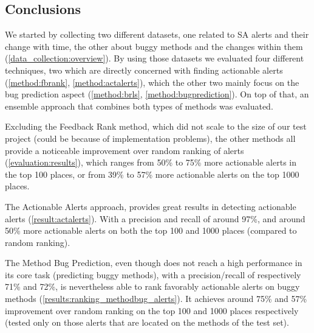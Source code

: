 \subsection{Conclusions}

We started by collecting two different datasets, one related to SA alerts and their change with time, the other about buggy methods and the changes within them (\cref{data_collection:overview}). By using those datasets we evaluated four different techniques, two which are directly concerned with finding actionable alerts (\cref{method:fbrank}, \cref{method:actalerts}), which the other two mainly focus on the bug prediction aspect (\cref{method:brls}, \cref{method:bugprediction}).
On top of that, an ensemble approach that combines both types of methods was evaluated.

Excluding the Feedback Rank method, which did not scale to the size of our test project (could be because of implementation problems), the other methods all provide a noticeable improvement over random ranking of alerts (\cref{evaluation:results}), which ranges from 50\% to 75\% more actionable alerts in the top 100 places, or from 39\% to 57\% more actionable alerts on the top 1000 places. 

The Actionable Alerts approach, provides great results in detecting actionable alerts (\cref{result:actalerts}). With a precision and recall of around 97\%, and around 50\% more actionable alerts on both the top 100 and 1000 places (compared to random ranking). 

The Method Bug Prediction, even though does not reach a high performance in its core task (predicting buggy methods), with a precision/recall of respectively 71\% and 72\%, is nevertheless able to rank favorably actionable alerts on buggy methods (\cref{results:ranking_methodbug_alerts}). It achieves around 75\% and 57\% improvement over random ranking on the top 100 and 1000 places respectively (tested only on those alerts that are located on the methods of the test set).

